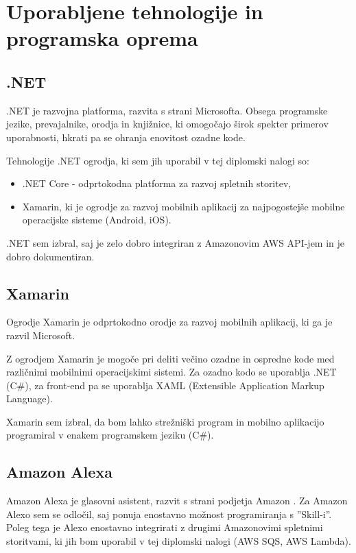 \documentclass[a4paper, 12pt]{book}
\begin{document}
\section{Uporabljene tehnologije in programska oprema}

\subsection{.NET}

.NET je razvojna platforma, razvita s strani Microsofta.
Obsega programske jezike, prevajalnike, orodja in knjižnice, ki omogočajo širok spekter primerov uporabnosti, hkrati pa se ohranja enovitost ozadne kode.

Tehnologije .NET ogrodja, ki sem jih uporabil v tej diplomski nalogi so:
\begin{itemize}
	\item .NET Core - odprtokodna platforma za razvoj spletnih storitev,
	\item Xamarin, ki je ogrodje za razvoj mobilnih aplikacij za najpogostejše mobilne operacijske sisteme (Android, iOS).
\end{itemize}

.NET sem izbral, saj je zelo dobro integriran z Amazonovim AWS API-jem in je dobro dokumentiran.

\subsection{Xamarin}

Ogrodje Xamarin \cite{xamarin} je odprtokodno orodje za razvoj mobilnih aplikacij, ki ga je razvil Microsoft. 

Z ogrodjem Xamarin je mogoče pri deliti večino ozadne in ospredne kode med različnimi mobilnimi operacijskimi sistemi. 
Za ozadno kodo se uporablja .NET (C\#), za front-end pa se uporablja XAML (Extensible Application Markup Language).

Xamarin sem izbral, da bom lahko strežniški program in mobilno aplikacijo programiral v enakem programskem jeziku (C\#).

\subsection{Amazon Alexa}

Amazon Alexa je glasovni asistent, razvit s strani podjetja Amazon \cite{alexa}.
Za Amazon Alexo sem se odločil, saj ponuja enostavno možnost programiranja s ''Skill-i''.
Poleg tega je Alexo enostavno integrirati z drugimi Amazonovimi spletnimi storitvami, ki jih bom uporabil v tej diplomski nalogi (AWS SQS, AWS Lambda).
\end{document}
